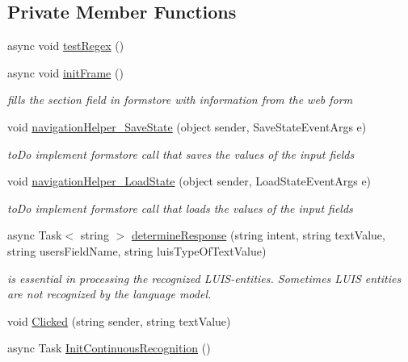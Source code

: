 \subsection*{Private Member Functions}
\begin{DoxyCompactItemize}
\item 
async void \hyperlink{class_listen_to_me_1_1_main_page_ae285c1eb3d44999ceecdb1b4f5a7bf83}{test\+Regex} ()
\item 
async void \hyperlink{class_listen_to_me_1_1_main_page_a781bed1ae1145079c62597b5a938c0d1}{init\+Frame} ()
\begin{DoxyCompactList}\small\item\em fills the section field in formstore with information from the web form \end{DoxyCompactList}\item 
void \hyperlink{class_listen_to_me_1_1_main_page_abd810ebce6d7300369767bd604e107d2}{navigation\+Helper\+\_\+\+Save\+State} (object sender, Save\+State\+Event\+Args e)
\begin{DoxyCompactList}\small\item\em to\+Do implement formstore call that saves the values of the input fields \end{DoxyCompactList}\item 
void \hyperlink{class_listen_to_me_1_1_main_page_a696e8f4cb397c01ba2465d68e2b8c369}{navigation\+Helper\+\_\+\+Load\+State} (object sender, Load\+State\+Event\+Args e)
\begin{DoxyCompactList}\small\item\em to\+Do implement formstore call that loads the values of the input fields \end{DoxyCompactList}\item 
async Task$<$ string $>$ \hyperlink{class_listen_to_me_1_1_main_page_ab68e25e8370c434b0deb5069c7cdd254}{determine\+Response} (string intent, string text\+Value, string users\+Field\+Name, string luis\+Type\+Of\+Text\+Value)
\begin{DoxyCompactList}\small\item\em is essential in processing the recognized L\+U\+I\+S-\/entities. Sometimes L\+U\+IS entities are not recognized by the language model. \end{DoxyCompactList}\item 
void \hyperlink{class_listen_to_me_1_1_main_page_a465e7f9723aec19e912a3913841d477e}{Clicked} (string sender, string text\+Value)
\item 
async Task \hyperlink{class_listen_to_me_1_1_main_page_adbf1a6a0cab368d6e803bbd1b918a045}{Init\+Continuous\+Recognition} ()

\end{DoxyCompactItemize}
